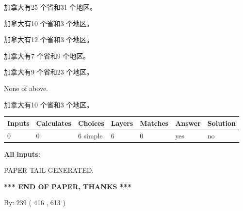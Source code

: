 \documentclass{ctexart}
\begin{document}
 
加拿大有25 个省和31 个地区。
 
 
加拿大有10 个省和3 个地区。
 
 
加拿大有12 个省和3 个地区。
 
 
加拿大有7 个省和9 个地区。
 
 
加拿大有9 个省和23 个地区。
 
 
 None of above.
 
 
\noindent{}
 
 
加拿大有10 个省和3 个地区。
 
 
\noindent{}
 
 
   
   
   
   
\noindent\begin{tabular}{|l|l|l|l|l|l|l|}
 \hline
Inputs & Calculates & Choices & Layers & Matches & Answer & Solution \\ \hline
 0  & 
 0  & 
 6
  simple  
  & 
 6  & 
 0  & 
  yes & 
  no 
  \\ \hline
 \end{tabular}
   
   
   
   
\noindent{}
   
   
   
   
\noindent\vspace{0.1in}\hspace{-0.08in} {\textbf{\Large{All inputs: }}}
   
   
   
   
   
   
 \vspace{0.2in}
 
   
   
\vspace{2.0in} PAPER TAIL GENERATED.
   
   
   
   
\vspace{1.0in} 
{\textbf{\large{ *** END OF PAPER, THANKS *** }}} 
   
   
\hspace{1.0in} By: 
 239 ( 416 ,  613 )
   
\end{document}
